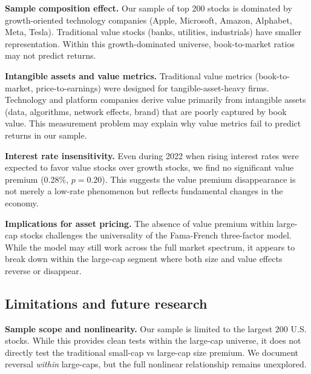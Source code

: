 \documentclass[10pt,letterpaper]{article}
\begin{document}
\textbf{Sample composition effect.} Our sample of top 200 stocks is dominated by growth-oriented technology companies (Apple, Microsoft, Amazon, Alphabet, Meta, Tesla). Traditional value stocks (banks, utilities, industrials) have smaller representation. Within this growth-dominated universe, book-to-market ratios may not predict returns.

\textbf{Intangible assets and value metrics.} Traditional value metrics (book-to-market, price-to-earnings) were designed for tangible-asset-heavy firms. Technology and platform companies derive value primarily from intangible assets (data, algorithms, network effects, brand) that are poorly captured by book value. This measurement problem may explain why value metrics fail to predict returns in our sample.

\textbf{Interest rate insensitivity.} Even during 2022 when rising interest rates were expected to favor value stocks over growth stocks, we find no significant value premium (0.28\%, $p=0.20$). This suggests the value premium disappearance is not merely a low-rate phenomenon but reflects fundamental changes in the economy.

\textbf{Implications for asset pricing.} The absence of value premium within large-cap stocks challenges the universality of the Fama-French three-factor model. While the model may still work across the full market spectrum, it appears to break down within the large-cap segment where both size and value effects reverse or disappear.

\subsection*{Limitations and future research}

\textbf{Sample scope and nonlinearity.} Our sample is limited to the largest 200 U.S. stocks. While this provides clean tests within the large-cap universe, it does not directly test the traditional small-cap vs large-cap size premium. We document reversal \textit{within} large-caps, but the full nonlinear relationship remains unexplored.
\end{document}
